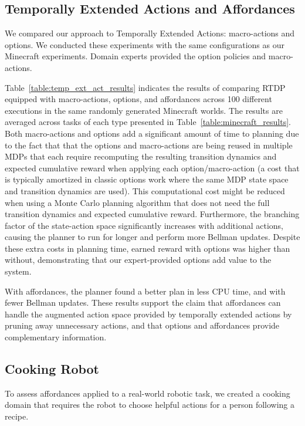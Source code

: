 \documentclass[letterpaper]{article}
\begin{document}
\subsection{Temporally Extended Actions and Affordances}

We compared our approach to Temporally Extended Actions: macro-actions
and options. We conducted these experiments with the same
configurations as our Minecraft experiments. Domain experts provided
the option policies and macro-actions.

Table~\ref{table:temp_ext_act_results} indicates the results of
comparing RTDP equipped with macro-actions, options, and affordances
across 100 different executions in the same randomly generated
Minecraft worlds. The results are averaged across tasks of each type
presented in Table~\ref{table:minecraft_results}. Both macro-actions
and options add a significant amount of time to planning due to the
fact that that the options and macro-actions are being reused in
multiple MDPs that each require recomputing the resulting transition
dynamics and expected cumulative reward when applying each
option/macro-action (a cost that is typically amortized in classic
options work where the same MDP state space and transition dynamics
are used). This computational cost might be reduced when using a Monte
Carlo planning algorithm that does not need the full transition
dynamics and expected cumulative reward.  Furthermore, the branching
factor of the state-action space significantly increases with
additional actions, causing the planner to run for longer and perform
more Bellman updates.  Despite these extra costs in planning time,
earned reward with options was higher than without, demonstrating that
our expert-provided options add value to the system.

With affordances, the planner found a better plan in less CPU time,
and with fewer Bellman updates. These results support the claim that
affordances can handle the augmented action space provided by
temporally extended actions by pruning away unnecessary actions, and
that options and affordances provide complementary information.

\subsection{Cooking Robot}

To assess affordances applied to a real-world robotic task, we created
a cooking domain that requires the robot to choose helpful actions for
a person following a recipe.  
\end{document}
